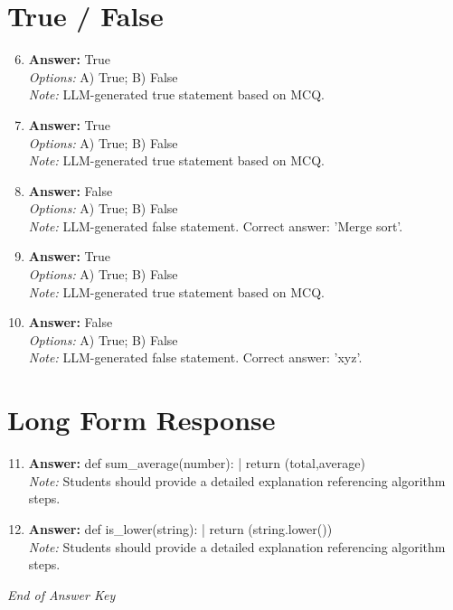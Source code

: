 \documentclass[12pt]{article}
\begin{document}
\section*{True / False}
\begin{enumerate}[label=\arabic*.]
\setcounter{enumi}{5}
\item \textbf{Answer:} True
\\ \textit{Options:} A) True; B) False
\\ \textit{Note:} LLM-generated true statement based on MCQ.
\item \textbf{Answer:} True
\\ \textit{Options:} A) True; B) False
\\ \textit{Note:} LLM-generated true statement based on MCQ.
\item \textbf{Answer:} False
\\ \textit{Options:} A) True; B) False
\\ \textit{Note:} LLM-generated false statement. Correct answer: 'Merge sort'.
\item \textbf{Answer:} True
\\ \textit{Options:} A) True; B) False
\\ \textit{Note:} LLM-generated true statement based on MCQ.
\item \textbf{Answer:} False
\\ \textit{Options:} A) True; B) False
\\ \textit{Note:} LLM-generated false statement. Correct answer: 'xyz'.
\end{enumerate}

\section*{Long Form Response}
\begin{enumerate}[label=\arabic*.]
\setcounter{enumi}{10}
\item \textbf{Answer:} def sum\_average(number): | return (total,average)
\\ \textit{Note:} Students should provide a detailed explanation referencing algorithm steps.
\item \textbf{Answer:} def is\_lower(string): | return (string.lower())
\\ \textit{Note:} Students should provide a detailed explanation referencing algorithm steps.
\end{enumerate}

\vfill
\noindent\textit{End of Answer Key}
\end{document}
